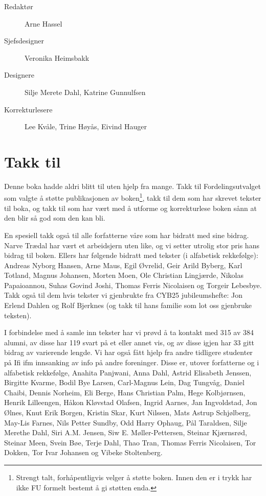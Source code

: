 \begin{description}
	\item[Redaktør] Arne Hassel
	\item[Sjefsdesigner] Veronika Heimsbakk
	\item[Designere] Silje Merete Dahl, Katrine Gunnulfsen
	\item[Korrekturlesere] Lee Kvåle, Trine Høyås, Eivind Hauger
\end{description}

\section*{Takk til}

Denne boka hadde aldri blitt til uten hjelp fra mange. Takk til Fordelingsutvalget som valgte å støtte publikasjonen av boken\footnote{Strengt talt, forhåpentligvis velger å støtte boken. Innen den er i trykk har ikke FU formelt bestemt å gi støtten enda.}, takk til dem som har skrevet tekster til boka, og takk til som har vært med å utforme og korrekturlese boken sånn at den blir så god som den kan bli.

En spesiell takk også til alle forfatterne våre som har bidratt med sine bidrag. Narve Trædal har vært et arbeidsjern uten like, og vi setter utrolig stor pris hans bidrag til boken. Ellers har følgende bidratt med tekster (i alfabetisk rekkefølge): Andreas Nyborg Hansen, Arne Maus, Egil Øvrelid, Geir Arild Byberg, Karl Totland, Magnus Johansen, Morten Moen, Ole Christian Lingjærde, Nikolas Papaioannou, Suhas Govind Joshi, Thomas Ferris Nicolaisen og Torgeir Lebesbye. Takk også til dem hvis tekster vi gjenbrukte fra CYB25 jubileumshefte: Jon Erlend Dahlen og Rolf Bjerknes (og takk til hans familie som lot oss gjenbruke teksten).

I forbindelse med å samle inn tekster har vi prøvd å ta kontakt med 315 av 384 alumni, av disse har 119 svart på et eller annet vis, og av disse igjen har 33 gitt bidrag av varierende lengde. Vi har også fått hjelp fra andre tidligere studenter på Ifi ifm innsanking av info på andre foreninger. Disse er, utover forfatterne og i alfabetisk rekkefølge, Anahita Panjwani, Anna Dahl, Astrid Elisabeth Jenssen, Birgitte Kvarme, Bodil Bye Larsen, Carl-Magnus Lein, Dag Tungvåg, Daniel Chaibi, Dennis Norheim, Eli Berge, Hans Christian Palm, Hege Kolbjørnsen, Henrik Lilleengen, Håkon Kløvstad Olafsen, Ingrid Aarnes, Jan Ingvoldstad, Jon Ølnes, Knut Erik Borgen, Kristin Skar, Kurt Nilssen, Mats Astrup Schjølberg, May-Lis Farnes, Nils Petter Sundby, Odd Harry Ophaug, Pål Taraldsen, Silje Merethe Dahl, Siri A.M. Jensen, Siw E. Møller-Pettersen, Steinar Kjærnsrød, Steinar Meen, Svein Bøe, Terje Dahl, Thao Tran, Thomas Ferris Nicolaisen, Tor Dokken, Tor Ivar Johansen og Vibeke Stoltenberg.

